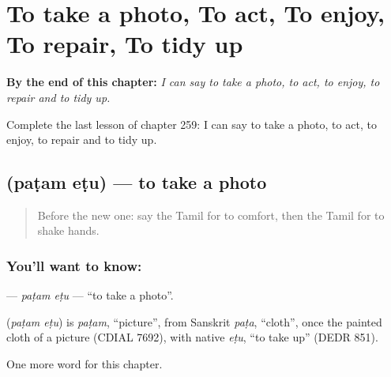
\chapter{To take a photo, To act, To enjoy, To repair, To tidy up}
\label{ch:ta-to-take-a-photo-to-act-to-enjoy-to-repair-to-tidy-up}

\begin{chapteropening}
\textbf{By the end of this chapter:} \emph{I can say to take a photo, to act, to enjoy, to repair and to tidy up.}

Complete the last lesson of chapter 259: I can say to take a photo, to act, to enjoy, to repair and to tidy up.
\end{chapteropening}

\section[\texorpdfstring{\ta{படம்} \ta{எடு} (paṭam eṭu)}{படம் எடு (paṭam eṭu)}]{  (paṭam eṭu) — to take a photo}

\label{lesson:TA-C259-patam-etu}



\begin{quote}
Before the new one: say the Tamil for to comfort, then the Tamil for to shake hands.
\end{quote}

\subsection*{You'll want to know:  }
\textbf{ } — \emph{paṭam eṭu} — \textquotedblleft{}to take a photo\textquotedblright{}.

\begin{cousinweb}
\textbf{ } (\emph{paṭam eṭu}) is \emph{paṭam}, \textquotedblleft{}picture\textquotedblright{}, from Sanskrit \emph{paṭa}, \textquotedblleft{}cloth\textquotedblright{}, once the painted cloth of a picture (CDIAL 7692), with native \emph{eṭu}, \textquotedblleft{}to take up\textquotedblright{} (DEDR 851).
\end{cousinweb}

\begin{grammarlens}[title={What you've built}]
One more word for this chapter.
\end{grammarlens}

